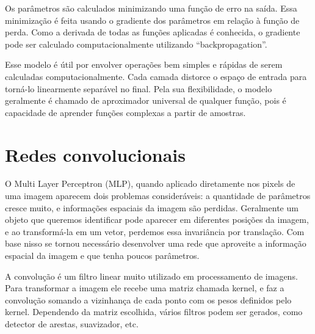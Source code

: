 
Os parâmetros são calculados minimizando
uma função de erro na saída. Essa minimização
é feita usando o gradiente dos parâmetros
em relação à função de perda. Como a derivada
de todas as funções aplicadas é conhecida,
o gradiente pode ser calculado computacionalmente
utilizando ``backpropagation''.




Esse modelo é útil por envolver operações
bem simples e rápidas de serem calculadas
computacionalmente. Cada camada distorce
o espaço de entrada para torná-lo linearmente
separável no final. Pela sua flexibilidade,
o modelo geralmente é chamado de aproximador 
universal de qualquer função, pois
é capacidade de aprender funções complexas
a partir de amostras.



\section{Redes convolucionais}



O Multi Layer Perceptron (MLP),
quando aplicado diretamente
nos pixels de uma imagem aparecem
dois problemas consideráveis:
a quantidade de parâmetros cresce muito,
e informações espaciais da imagem
são perdidas. Geralmente um objeto
que queremos identificar pode aparecer
em diferentes posições da imagem,
e ao transformá-la em um vetor,
perdemos essa invariância por translação.
Com base nisso se tornou necessário
desenvolver uma rede que aproveite
a informação espacial da imagem
e que tenha poucos parâmetros.


A convolução é um filtro linear 
muito utilizado em processamento
de imagens. Para transformar
a imagem ele recebe uma matriz
chamada kernel, e faz a convolução
somando a vizinhança de cada ponto
com os pesos definidos pelo kernel.
Dependendo da matriz escolhida,
vários filtros podem ser gerados,
como detector de arestas, suavizador,
etc.

